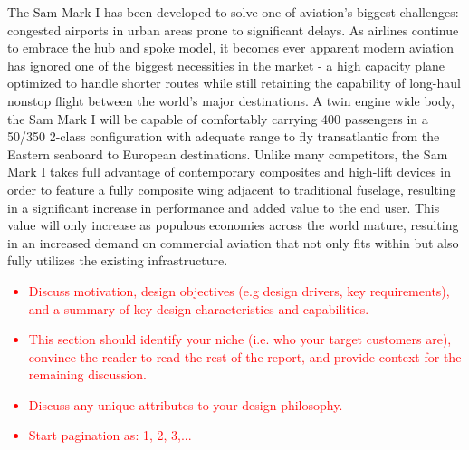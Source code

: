 The Sam Mark I has been developed to solve one of aviation's biggest challenges: congested airports in urban areas prone to significant delays.  As airlines continue to embrace the hub and spoke model, it becomes ever apparent modern aviation has ignored one of the biggest necessities in the market - a high capacity plane optimized to handle shorter routes while still retaining the capability of long-haul nonstop flight between the world's major destinations. A twin engine wide body, the Sam Mark I will be capable of comfortably carrying 400 passengers in a 50/350 2-class configuration with adequate range to fly transatlantic from the Eastern seaboard to European destinations.  Unlike many competitors, the Sam Mark I takes full advantage of contemporary composites and high-lift devices in order to feature a fully composite wing adjacent to traditional fuselage, resulting in a significant increase in performance and added value to the end user.  This value will only increase as populous economies across the world mature, resulting in an increased demand on commercial aviation that not only fits within but also fully utilizes the existing infrastructure. 



\textcolor{red}{
\begin{itemize}
    \item Discuss motivation, design objectives (e.g design drivers, key requirements), and a summary of key design characteristics and capabilities. 
    \item This section should identify your niche (i.e. who your target customers are), convince the reader to read the rest of the report, and provide context for the remaining discussion. 
    \item Discuss any unique attributes to your design philosophy. 
    \item Start pagination as: 1, 2, 3,... \checkmark
\end{itemize}}